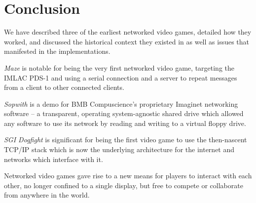 \section{Conclusion}\label{sec:conclusion}

We have described three of the earliest networked video games, detailed how they worked, and discussed the historical context they existed in as well as issues that manifested in the implementations.

\textit{Maze} is notable for being the very first networked video game, targeting the IMLAC PDS-1 and using a serial connection and a server to repeat messages from a client to other connected clients.

\textit{Sopwith} is a demo for BMB Compuscience's proprietary Imaginet networking software -- a transparent, operating system-agnostic shared drive which allowed any software to use its network by reading and writing to a virtual floppy drive.

\textit{SGI Dogfight} is significant for being the first video game to use the then-nascent TCP/IP stack which is now the underlying architecture for the internet and networks which interface with it.

Networked video games gave rise to a new means for players to interact with each other, no longer confined to a single display, but free to compete or collaborate from anywhere in the world.
